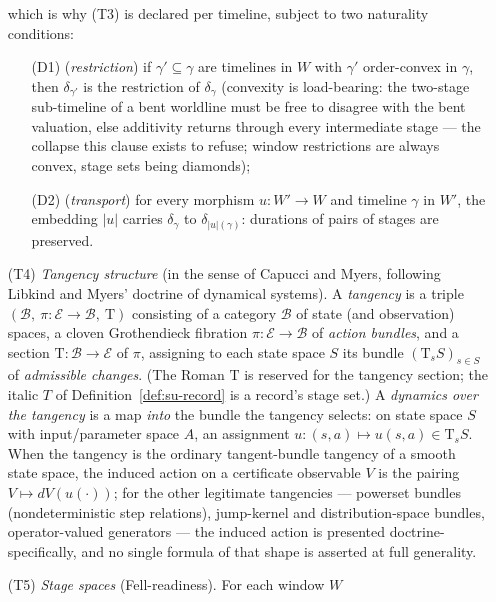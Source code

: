 \begin{definition}
\begin{enumerate}
  which is why (T3) is declared per timeline, subject to two
  naturality conditions:
  \begin{itemize}
  \item[(D1)] (\emph{restriction}) if $\gamma' \subseteq \gamma$ are
    timelines in $W$ with $\gamma'$ order-convex in $\gamma$, then
    $\delta_{\gamma'}$ is the restriction of $\delta_\gamma$
    (convexity is load-bearing: the two-stage sub-timeline of a bent
    worldline must be free to disagree with the bent valuation, else
    additivity returns through every intermediate stage --- the
    collapse this clause exists to refuse; window restrictions are
    always convex, stage sets being diamonds);
  \item[(D2)] (\emph{transport}) for every morphism
    $u \colon W' \to W$ and timeline $\gamma$ in $W'$, the embedding
    $|u|$ carries $\delta_\gamma$ to $\delta_{|u|(\gamma)}$:
    durations of pairs of stages are preserved.
  \end{itemize}
\item[(T4)] \emph{Tangency structure} (in the sense of Capucci and
  Myers, following Libkind and Myers' doctrine of dynamical systems).
  A \emph{tangency} is a triple
  $(\mathcal{B},\ \pi \colon \mathcal{E} \to \mathcal{B},\ \mathrm{T})$
  consisting of a category $\mathcal{B}$ of state (and observation)
  spaces, a cloven Grothendieck fibration
  $\pi \colon \mathcal{E} \to \mathcal{B}$ of \emph{action bundles},
  and a section $\mathrm{T} \colon \mathcal{B} \to \mathcal{E}$ of
  $\pi$, assigning to each state space $S$ its bundle
  $(\mathrm{T}_s S)_{s \in S}$ of \emph{admissible changes}. (The
  Roman $\mathrm{T}$ is reserved for the tangency section; the italic
  $T$ of Definition~\ref{def:su-record} is a record's stage set.)
  A \emph{dynamics over the tangency} is a map \emph{into} the bundle
  the tangency selects: on state space $S$ with input/parameter space
  $A$, an assignment $u \colon (s, a) \mapsto u(s,a) \in \mathrm{T}_s S$.
  When the tangency is the ordinary tangent-bundle tangency of a
  smooth state space, the induced action on a certificate observable
  $V$ is the pairing $V \mapsto dV(u(\cdot))$; for the other
  legitimate tangencies --- powerset bundles (nondeterministic step
  relations), jump-kernel and distribution-space bundles,
  operator-valued generators --- the induced action is presented
  doctrine-specifically, and no single formula of that shape is
  asserted at full generality.
\item[(T5)] \emph{Stage spaces} (Fell-readiness). For each window $W$

\end{enumerate}
\end{definition}
